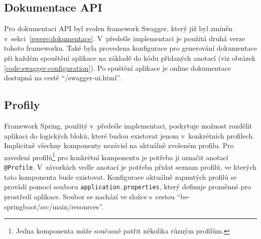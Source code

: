     
    \subsection{Dokumentace API}
        
        Pro dokumentaci API byl zvolen framework Swagger, který již byl zmíněn v~sekci~\ref{resere:dokumentace}. V~předešle implementaci je použitá druhá verze tohoto frameworku. Také byla provedena konfigurace pro generování dokumentace při každém spouštění aplikace na základě do kódu přidaných anotací (viz obrázek \ref{code:swagger-configuration}). Po spuštění aplikace je online dokumentace dostupná na cestě \enquote{/swagger-ui.html}.
    

    \subsection{Profily}\label{analyza:soucasnaImplementace:profily}
        Framework Spring, použitý v~předešle implementaci, poskytuje možnost rozdělit aplikaci do logických bloků, které budou existovat jenom v~konkrétních profilech.\cite{spring-profile} Implicitně všechny komponenty nezávisí na aktuálně zvoleném profilu. Pro zavedení profilů\footnote{Jedna komponenta může současně patřit několika různým profilům.} pro konkrétní komponentu je potřeba ji označit anotací \texttt{@Profile}. V~závorkách vedle anotací je potřeba přidat seznam profilů, ve kterých tato komponenta bude existovat. Konfigurace aktuálně zapnutých profilů se provádí pomocí souboru \texttt{application.properties}, který definuje proměnné pro prostředí aplikace. Soubor se nachází ve složce s~cestou \enquote{be-springboot/src/main/resources}.
    
